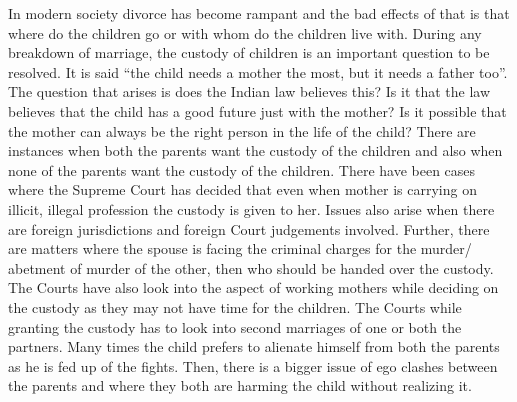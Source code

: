 \setcounter{figure}{0}
\setcounter{table}{0}
\setcounter{footnote}{0}


\begin{multicols}{2}


\noi
In modern society divorce has become rampant and the bad effects of that is that where do the
children go or with whom do the children live with. During any breakdown of marriage, the
custody of children is an important question to be resolved. It is said “the child needs a mother
the most, but it needs a father too”. The question that arises is does the Indian law believes this?
Is it that the law believes that the child has a good future just with the mother? Is it possible that
the mother can always be the right person in the life of the child? There are instances when both
the parents want the custody of the children and also when none of the parents want the custody
of the children. There have been cases where the Supreme Court has decided that even when
mother is carrying on illicit, illegal profession the custody is given to her. Issues also arise when
there are foreign jurisdictions and foreign Court judgements involved. Further, there are matters
where the spouse is facing the criminal charges for the murder/ abetment of murder of the other,
then who should be handed over the custody. The Courts have also look into the aspect of working
mothers while deciding on the custody as they may not have time for the children. The Courts
while granting the custody has to look into second marriages of one or both the partners. Many
times the child prefers to alienate himself from both the parents as he is fed up of the fights. Then,
there is a bigger issue of ego clashes between the parents and where they both are harming the
child without realizing it.


\end{multicols}
